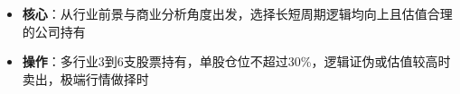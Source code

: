   \begin{itemize}[leftmargin=*]
    \item \textbf{核心}：从行业前景与商业分析角度出发，选择长短周期逻辑均向上且估值合理的公司持有
    \item \textbf{操作}：多行业3到6支股票持有，单股仓位不超过30\%，逻辑证伪或估值较高时卖出，极端行情做择时
  \end{itemize}